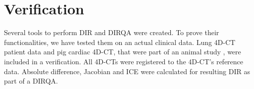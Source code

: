 \documentclass[type=dr, dr=rernat, accentcolor=tud7b,colorbacktitle, bigchapter, openright, twoside, 12pt ]{tudthesis}
\begin{document}
% 
% 
% 
% 
% 


\newpage
\section{Verification}
\label{Verification}

Several tools to perform DIR and DIRQA were created. 
To prove their functionalities, we have tested them on an actual clinical data. Lung 4D-CT patient data and pig cardiac 4D-CT, that were part of an animal study \cite{Lehmann2015},
were included in a verification. All 4D-CTs were registered to the 4D-CT's reference data. Absolute difference, Jacobian and ICE were calculated for resulting 
DIR as part of a DIRQA.
\end{document}
